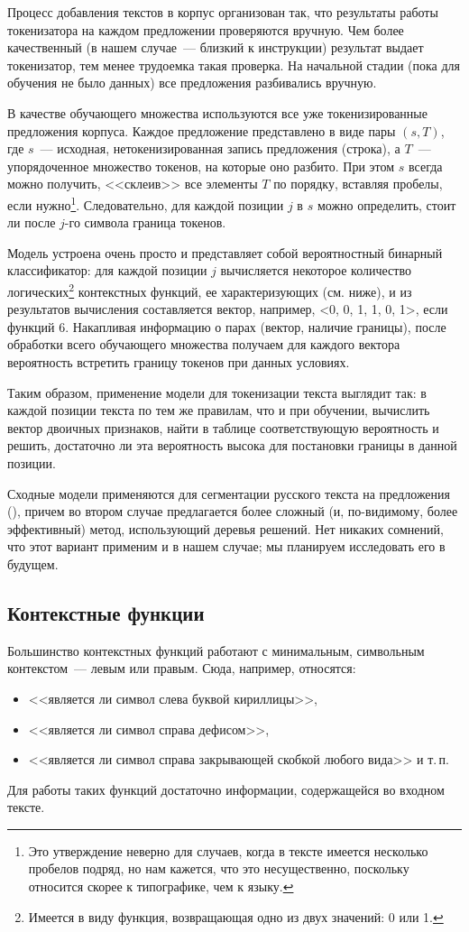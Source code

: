 \documentclass[a4paper]{article}
\begin{document}
Процесс добавления текстов в корпус организован так, что результаты работы токенизатора на каждом предложении проверяются вручную. Чем более качественный (в нашем случае~--- близкий к инструкции) результат выдает токенизатор, тем менее трудоемка такая проверка. На начальной стадии (пока для обучения не было данных) все предложения разбивались вручную.

В качестве обучающего множества используются все уже токенизированные предложения корпуса. Каждое предложение представлено в виде пары $(s, T)$, где $s$~--- исходная, нетокенизированная запись предложения (строка), а $T$~--- упорядоченное множество токенов, на которые оно разбито. При этом $s$ всегда можно получить, <<склеив>> все элементы $T$ по порядку, вставляя пробелы, если нужно\footnote{Это утверждение неверно для случаев, когда в тексте имеется несколько пробелов подряд, но нам кажется, что это несущественно, поскольку относится скорее к типографике, чем к языку.}. Следовательно, для каждой позиции $j$ в $s$ можно определить, стоит ли после $j$-го символа граница токенов.

Модель устроена очень просто и представляет собой вероятностный бинарный классификатор: для каждой позиции $j$ вычисляется некоторое количество логических\footnote{Имеется в виду функция, возвращающая одно из двух значений: 0 или 1.} контекстных функций, ее характеризующих (см. ниже), и из результатов вычисления составляется вектор, например, <0, 0, 1, 1, 0, 1>, если функций 6. Накапливая информацию о парах (вектор, наличие границы), после обработки всего обучающего множества получаем для каждого вектора вероятность встретить границу токенов при данных условиях.

Таким образом, применение модели для токенизации текста выглядит так: в каждой позиции текста по тем же правилам, что и при обучении, вычислить вектор двоичных признаков, найти в таблице соответствующую вероятность и решить, достаточно ли эта вероятность высока для постановки границы в данной позиции.

Сходные модели применяются для сегментации русского текста на предложения (\cite{uryupina_dialog08}\cite{kudinov_dialog11}), причем во втором случае предлагается более сложный (и, по-видимому, более эффективный) метод, использующий деревья решений. Нет никаких сомнений, что этот вариант применим и в нашем случае; мы планируем исследовать его в будущем.
\subsection{Контекстные функции}
Большинство контекстных функций работают с минимальным, символьным контекстом~--- левым или правым. Сюда, например, относятся:
\begin{itemize}
\item{<<является ли символ слева буквой кириллицы>>,}
\item{<<является ли символ справа дефисом>>,}
\item{<<является ли символ справа закрывающей скобкой любого вида>> и т.\,п.}
\end{itemize}
Для работы таких функций достаточно информации, содержащейся во входном тексте.
\end{document}
